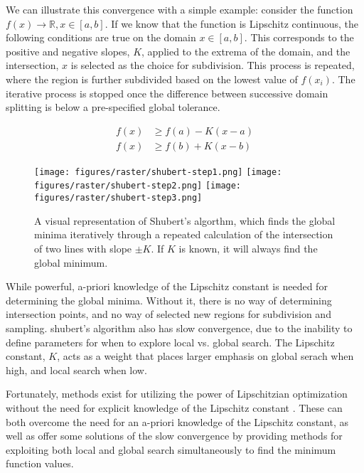 We can illustrate this convergence with a simple example: consider the function $f(x) \rightarrow \mathbb{R}, x \in [a,b]$. If we know that the function is Lipschitz continuous, the following conditions are true on the domain $x\in[a,b]$. This corresponds to the positive and negative slopes, $K$, applied to the extrema of the domain, and the intersection, $x$ is selected as the choice for subdivision. This process is repeated, where the region is further subdivided based on the lowest value of $f(x_i)$. The iterative process is stopped once the difference between successive domain splitting is below a pre-specified global tolerance. 

\begin{equation}
    \begin{aligned}
        f(x) &\ge f(a) - K(x - a) \\
        f(x) &\ge f(b) + K(x - b)
    \end{aligned}
    \label{eq:shubert}
\end{equation}

\begin{figure}
    \begin{center}
        \texttt{[image: figures/raster/shubert-step1.png]}
        \vspace{3mm}
        \texttt{[image: figures/raster/shubert-step2.png]}
        \vspace{3mm}
        \texttt{[image: figures/raster/shubert-step3.png]}
    \end{center}
    \label{fig:shubert}
    \caption{A visual representation of Shubert's algorthm, which finds the global minima iteratively through a repeated calculation of the intersection of two lines with slope $\pm K$. If $K$ is known, it will always find the global minimum.}
\end{figure}

While powerful, a-priori knowledge of the Lipschitz constant is needed for determining the global minima. Without it, there is no way of determining intersection points, and no way of selected new regions for subdivision and sampling. shubert's algorithm also has slow convergence, due to the inability to define parameters for when to explore local vs. global search. The Lipschitz constant, $K$, acts as a weight that places larger emphasis on global serach when high, and local search when low. 

Fortunately, methods exist for utilizing the power of Lipschitzian optimization without the need for explicit knowledge of the Lipschitz constant \cite{jonesLipschitzianOptimizationLipschitz1993}. These can both overcome the need for an a-priori knowledge of the Lipschitz constant, as well as offer some solutions of the slow convergence by providing methods for exploiting both local and global search simultaneously to find the minimum function values.

